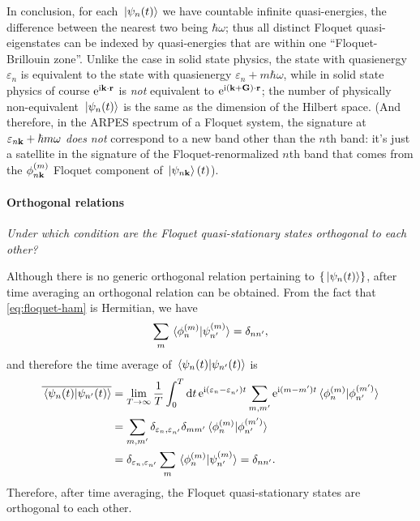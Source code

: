 \documentclass[hyperref, a4paper]{article}
\newcommand*{\ii}{\mathrm{i}}
\newcommand*{\ee}{\mathrm{e}}
\begin{document}
In conclusion, for each $\ket*{\psi_n(t)}$ 
we have countable infinite quasi-energies,
the difference between the nearest two being $\hbar \omega$;
thus all distinct Floquet quasi-eigenstates can be indexed 
by quasi-energies that are within one ``Floquet-Brillouin zone''.
Unlike the case in solid state physics, 
the state with quasienergy $\varepsilon_n$ is equivalent to 
the state with quasienergy $\varepsilon_n + m \hbar \omega$,
while in solid state physics 
of course $\ee^{\ii \vb{k} \cdot \vb{r}}$ is \emph{not} equivalent to $\ee^{\ii (\vb{k} + \vb{G}) \cdot \vb{r}}$;
the number of physically non-equivalent $\ket*{\psi_n(t)}$
is the same as the dimension of the Hilbert space.
(And therefore, in the ARPES spectrum of a Floquet system, 
the signature at $\varepsilon_{n \vb{k}} + \hbar m \omega$
\emph{does not} correspond to a new band other than the $n$th band: 
it's just a satellite in the signature of the Floquet-renormalized $n$th band 
that comes from the $\phi_{n \vb{k}}^{(m)}$ Floquet component of $\ket*{\psi_{n \vb{k}}}(t)$).

\paragraph*{Orthogonal relations} 
\textit{
    Under which condition are the Floquet quasi-stationary states orthogonal to each other?
}

Although there is no generic orthogonal relation pertaining to $\{\ket*{\psi_n(t)}\}$,
after time averaging an orthogonal relation can be obtained.
From the fact that \eqref{eq:floquet-ham} is Hermitian, we have 
\begin{equation}
    \sum_m \braket*{\phi_n^{(m)}}{\psi_{n'}^{(m)}} = \delta_{nn'},
\end{equation}
and therefore the time average of $\braket*{\psi_n(t)}{\psi_{n'}(t)}$ is 
\begin{equation}
    \begin{aligned}
        \overline{\braket*{\psi_n(t)}{\psi_{n'}(t)}} &= 
        \lim_{T \to \infty} \frac{1}{T} \int_{0}^{T} \dd{t} 
        \ee^{\ii (\varepsilon_n - \varepsilon_{n'}) t}
        \sum_{m, m'}  \ee^{\ii (m - m') t}
        \braket*{\phi_n^{(m)}}{\phi_{n'}^{(m')}} \\
        &= \sum_{m, m'} \delta_{\varepsilon_n, \varepsilon_{n'}}
        \delta_{mm'} \braket*{\phi_n^{(m)}}{\phi_{n'}^{(m')}}  \\
        &= \delta_{\varepsilon_n, \varepsilon_{n'}} \sum_{m} \braket*{\phi_n^{(m)}}{\psi_{n'}^{(m)}}
        = \delta_{nn'}.
    \end{aligned}
    \label{eq:orthogonal}
\end{equation}
Therefore, after time averaging, the Floquet quasi-stationary states 
are orthogonal to each other.




\printbibliography
\end{document}
